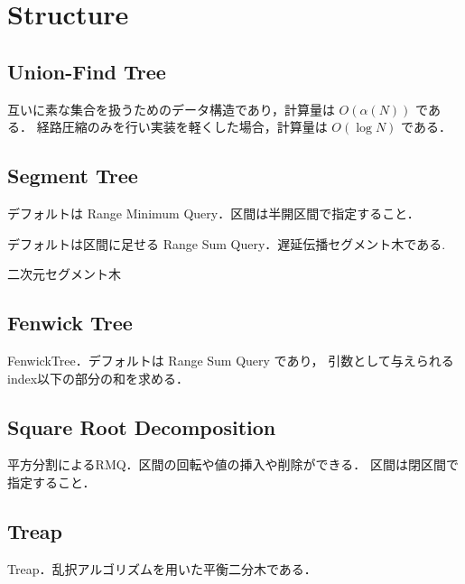 \section{Structure}

\subsection{Union-Find Tree}
互いに素な集合を扱うためのデータ構造であり，計算量は $O(\alpha(N))$ である．
経路圧縮のみを行い実装を軽くした場合，計算量は $O(\log N)$ である．


\subsection{Segment Tree}
デフォルトは Range Minimum Query．区間は半開区間で指定すること．

デフォルトは区間に足せる Range Sum Query．遅延伝播セグメント木である.

二次元セグメント木


\subsection{Fenwick Tree}
FenwickTree．デフォルトは Range Sum Query であり，
引数として与えられるindex以下の部分の和を求める．


\subsection{Square Root Decomposition}
平方分割によるRMQ．区間の回転や値の挿入や削除ができる．
区間は閉区間で指定すること．


\subsection{Treap}
Treap．乱択アルゴリズムを用いた平衡二分木である．

